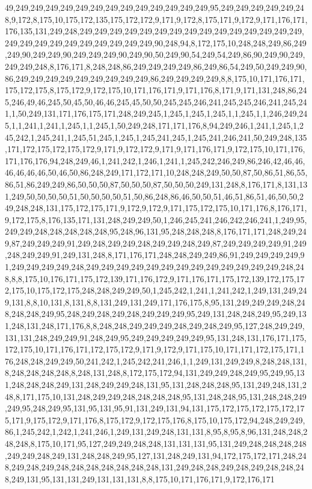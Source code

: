 49,249,249,249,249,249,249,249,249,249,249,249,249,249,95,249,249,249,249,249,248,9,172,8,175,10,175,172,135,175,172,172,9,171,9,172,8,175,171,9,172,9,171,176,171,176,135,131,249,248,249,249,249,249,249,249,249,249,249,249,249,249,249,249,249,249,249,249,249,249,249,249,249,249,249,90,248,94,8,172,175,10,248,248,249,86,249,249,90,249,249,90,249,249,249,90,249,90,50,249,90,54,249,54,249,86,90,249,90,249,249,249,248,8,176,171,8,248,248,86,249,249,249,249,86,249,86,54,249,50,249,249,90,86,249,249,249,249,249,249,249,249,249,86,249,249,249,249,8,8,175,10,171,176,171,175,172,175,8,175,172,9,172,175,10,171,176,171,9,171,176,8,171,9,171,131,248,86,245,246,49,46,245,50,45,50,46,46,245,45,50,50,245,245,246,241,245,245,246,241,245,241,1,50,249,131,171,176,175,171,248,249,245,1,245,1,245,1,245,1,1,245,1,1,246,249,245,1,1,241,1,241,1,245,1,1,245,1,50,249,248,171,171,176,8,94,249,246,1,241,1,245,1,245,242,1,245,241,1,245,51,245,1,245,1,245,241,245,1,245,241,246,241,50,249,248,135,171,172,175,172,175,172,9,171,9,172,172,9,171,9,171,176,171,9,172,175,10,171,176,171,176,176,94,248,249,46,1,241,242,1,246,1,241,1,245,242,246,249,86,246,42,46,46,46,46,46,46,50,46,50,86,248,249,171,172,171,10,248,248,249,50,50,87,50,86,51,86,55,86,51,86,249,249,86,50,50,50,87,50,50,50,87,50,50,50,249,131,248,8,176,171,8,131,131,249,50,50,50,50,51,50,50,50,50,51,50,86,248,86,46,50,50,51,46,51,86,51,46,50,50,249,248,248,131,175,172,175,171,9,172,9,172,9,171,175,172,175,10,171,176,8,176,171,9,172,175,8,176,135,171,131,248,249,249,50,1,246,245,241,246,242,246,241,1,249,95,249,249,248,248,248,248,248,95,248,96,131,95,248,248,248,8,176,171,171,248,249,249,87,249,249,249,91,249,248,249,249,248,249,249,248,249,87,249,249,249,249,91,249,248,249,249,91,249,131,248,8,171,176,171,248,248,249,249,86,91,249,249,249,249,91,249,249,249,249,248,249,249,249,249,249,249,249,249,249,249,249,249,249,248,248,8,8,175,10,176,171,175,172,139,171,176,172,9,171,176,171,175,172,139,172,175,172,175,10,175,172,175,248,248,249,249,50,1,245,242,1,241,1,241,242,1,249,131,249,249,131,8,8,10,131,8,131,8,8,131,249,131,249,171,176,175,8,95,131,249,249,249,248,248,248,248,249,95,248,249,248,249,248,249,249,249,95,249,131,248,248,249,95,249,131,248,131,248,171,176,8,8,248,248,249,249,249,248,249,248,249,95,127,248,249,249,131,131,248,249,249,91,248,249,95,249,249,249,249,249,95,131,248,131,176,171,175,172,175,10,171,176,171,172,175,172,9,171,9,172,9,171,175,10,171,171,172,175,171,176,248,248,249,249,50,241,242,1,245,242,241,246,1,1,249,131,249,249,8,248,248,131,8,248,248,248,248,8,248,131,248,8,172,175,172,94,131,249,249,248,249,95,249,95,131,248,248,248,249,131,248,249,249,248,131,95,131,248,248,248,95,131,249,248,131,248,8,171,175,10,131,248,249,249,248,248,248,248,95,131,248,248,95,131,248,248,249,249,95,248,249,95,131,95,131,95,91,131,249,131,94,131,175,172,175,172,175,172,175,171,9,175,172,9,171,176,8,175,172,9,172,175,176,8,175,10,175,172,94,248,249,249,86,1,245,242,1,242,1,241,246,1,249,131,249,248,131,131,8,95,8,95,8,96,131,248,248,248,248,8,175,10,171,95,127,249,249,248,248,131,131,131,95,131,249,248,248,248,248,249,249,248,249,131,248,248,249,95,127,131,248,249,131,94,172,175,172,171,248,248,249,248,249,248,248,248,248,248,248,248,131,249,248,248,249,248,249,248,248,248,249,131,95,131,131,249,131,131,131,8,8,175,10,171,176,171,9,172,176,171